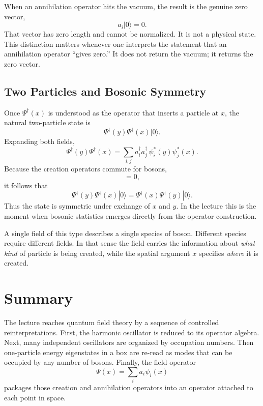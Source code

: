 When an annihilation operator hits the vacuum, the result is the genuine zero vector,
\begin{equation}
a_i|0\rangle = 0.
\end{equation}
That vector has zero length and cannot be normalized. It is not a physical state. This distinction matters whenever one interprets the statement that an annihilation operator ``gives zero.'' It does not return the vacuum; it returns the zero vector.

\subsection{Two Particles and Bosonic Symmetry}

Once \(\Psi^\dagger(x)\) is understood as the operator that inserts a particle at \(x\), the natural two-particle state is
\begin{equation}
\Psi^\dagger(y)\Psi^\dagger(x)|0\rangle.
\end{equation}
Expanding both fields,
\begin{equation}
\Psi^\dagger(y)\Psi^\dagger(x)
=
\sum_{i,j} a_i^\dagger a_j^\dagger \,\psi_i^*(y)\psi_j^*(x).
\end{equation}
Because the creation operators commute for bosons,
\begin{equation}
[a_i^\dagger,a_j^\dagger]=0,
\end{equation}
it follows that
\begin{equation}
\Psi^\dagger(y)\Psi^\dagger(x)|0\rangle
=
\Psi^\dagger(x)\Psi^\dagger(y)|0\rangle.
\end{equation}
Thus the state is symmetric under exchange of \(x\) and \(y\). In the lecture this is the moment when bosonic statistics emerges directly from the operator construction.

A single field of this type describes a single species of boson. Different species require different fields. In that sense the field carries the information about \emph{what kind} of particle is being created, while the spatial argument \(x\) specifies \emph{where} it is created.

\section{Summary}

The lecture reaches quantum field theory by a sequence of controlled reinterpretations. First, the harmonic oscillator is reduced to its operator algebra. Next, many independent oscillators are organized by occupation numbers. Then one-particle energy eigenstates in a box are re-read as modes that can be occupied by any number of bosons. Finally, the field operator
\begin{equation}
\Psi(x)=\sum_i a_i\psi_i(x)
\end{equation}
packages those creation and annihilation operators into an operator attached to each point in space.

